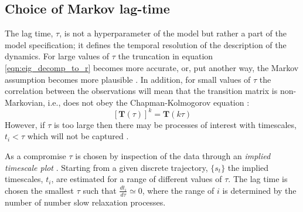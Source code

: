 \subsection{Choice of Markov lag-time}
The lag time, $\tau$, is not a hyperparameter of the model but rather a part of the model specification; it defines the temporal resolution of the description of the dynamics. For large values of $\tau$ the truncation in equation \ref{eqn:eig_decomp_to_r} becomes more accurate, or, put another way, the Markov assumption becomes more plausible \cite{prinzMarkovModelsMolecular2011}. In addition, for small values of $\tau$ the correlation between the observations will mean that the transition matrix is non-Markovian, i.e., does not obey the Chapman-Kolmogorov equation \cite{wasserman2013all}:
\begin{equation}\label{eqn:ck_eqn}
[\mathbf{T}(\tau)]^{k} = \mathbf{T}(k \tau)
\end{equation}
However, if $\tau$ is too large then there may be processes of interest with timescales, $t_{i}<\tau$ which will not be captured \cite{prinzMarkovModelsMolecular2011}.

As a compromise $\tau$ is chosen by inspection of the data through an \emph{implied timescale plot} \cite{prinzMarkovModelsMolecular2011,swopeDescribingProteinFolding2004a}. Starting from a given discrete trajectory, $\{s_{t}\}$ the implied timescales, $t_{i}$, are estimated for a range of different values of $\tau$. The lag time is chosen the smallest $\tau$ such that $\frac{d t_{i}}{d \tau} \simeq 0$, where the range of $i$ is determined by the number of number slow relaxation processes. 

